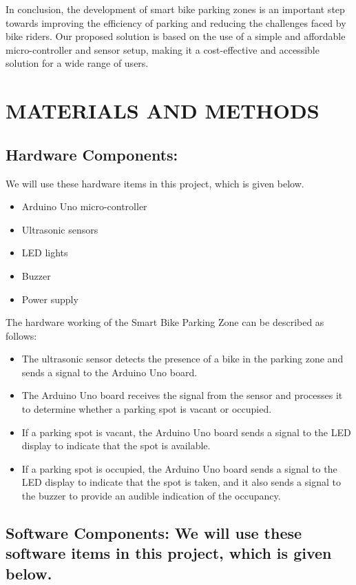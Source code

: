 \documentclass[conference]{IEEEtran}
\begin{document}
	In conclusion, the development of smart bike parking zones is an important step towards improving the efficiency of parking and reducing the challenges faced by bike riders. Our proposed solution is based on the use of a simple and affordable micro-controller and sensor setup, making it a cost-effective and accessible solution for a wide range of users.
	
	\section{MATERIALS AND METHODS}
	

	\subsection{Hardware Components:}
		 We will use these hardware items in this project, which is given below.

	\begin{itemize}
	\item Arduino Uno micro-controller
	\item Ultrasonic sensors
	\item LED lights
	\item Buzzer
	\item Power supply
	\end{itemize}
The hardware working of the Smart Bike Parking Zone can be described as follows:
	\begin{itemize}
	\item The ultrasonic sensor detects the presence of a bike in the parking zone and sends a signal to the Arduino Uno board.
	\item The Arduino Uno board receives the signal from the sensor and processes it to determine whether a parking spot is vacant or occupied.
	\item If a parking spot is vacant, the Arduino Uno board sends a signal to the LED display to indicate that the spot is available.
	\item If a parking spot is occupied, the Arduino Uno board sends a signal to the LED display to indicate that the spot is taken, and it also sends a signal to the buzzer to provide an audible indication of the occupancy.
\end{itemize}


	\subsection{Software Components: We will use these software items in this project, which is given below.}
	
\end{document}
